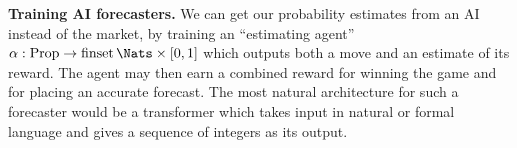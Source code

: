 \textbf{Training AI forecasters.} We can get our probability estimates from an AI instead of the market, by training an ``estimating agent'' $\alpha:\Props\to\finset\Nats\times[0,1]$ which outputs both a move and an estimate of its reward. The agent may then earn a combined reward for winning the game and for placing an accurate forecast. The most natural architecture for such a forecaster would be a transformer which takes input in natural or formal language and gives a sequence of integers as its output. %










